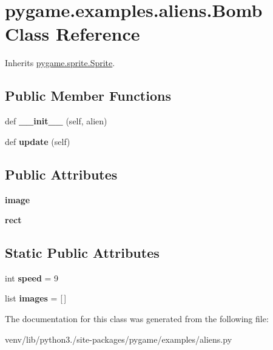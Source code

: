 \hypertarget{classpygame_1_1examples_1_1aliens_1_1_bomb}{}\section{pygame.\+examples.\+aliens.\+Bomb Class Reference}
\label{classpygame_1_1examples_1_1aliens_1_1_bomb}


Inherits \hyperlink{classpygame_1_1sprite_1_1_sprite}{pygame.\+sprite.\+Sprite}.

\subsection*{Public Member Functions}
\begin{DoxyCompactItemize}
\item 
\mbox{\label{classpygame_1_1examples_1_1aliens_1_1_bomb_ac16fd8927125c33adbbf222ba87ca3c3}} 
def {\bfseries \+\_\+\+\_\+init\+\_\+\+\_\+} (self, alien)
\item 
\mbox{\label{classpygame_1_1examples_1_1aliens_1_1_bomb_aadb20522fd855edce272fe86b0a6d023}} 
def {\bfseries update} (self)
\end{DoxyCompactItemize}
\subsection*{Public Attributes}
\begin{DoxyCompactItemize}
\item 
\mbox{\label{classpygame_1_1examples_1_1aliens_1_1_bomb_a667d7603eaa411ebd74637f0983fde02}} 
{\bfseries image}
\item 
\mbox{\label{classpygame_1_1examples_1_1aliens_1_1_bomb_aa141b6c94bd3f723ce27427f1fcd14b5}} 
{\bfseries rect}
\end{DoxyCompactItemize}
\subsection*{Static Public Attributes}
\begin{DoxyCompactItemize}
\item 
\mbox{\label{classpygame_1_1examples_1_1aliens_1_1_bomb_ad56e7f7b2f2f4e1928f90dcc4d498b85}} 
int {\bfseries speed} = 9
\item 
\mbox{\label{classpygame_1_1examples_1_1aliens_1_1_bomb_a24c7e63e4e98caaec48f6da899788d8f}} 
list {\bfseries images} = \mbox{[}$\,$\mbox{]}
\end{DoxyCompactItemize}


The documentation for this class was generated from the following file\+:\begin{DoxyCompactItemize}
\item 
venv/lib/python3./site-\/packages/pygame/examples/aliens.\+py\end{DoxyCompactItemize}
